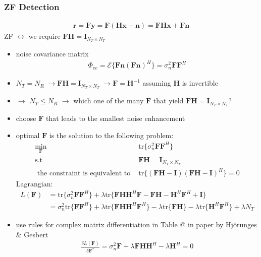 \documentclass[a4paper, 10pt]{article}
\makeatletter
\newcommand{\Rmnum}[1]{\expandafter\@slowromancap\romannumeral #1@}
\makeatother
\begin{document}
\subsubsection{ZF Detection}
\begin{align*}
	\mathbf{r}=\mathbf{Fy}=\mathbf{F}(\mathbf{Hx}+\mathbf{n})=\mathbf{FHx}+\mathbf{Fn}
\end{align*}
ZF $\leftrightarrow$ we require $\mathbf{FH}=\mathbf{I}_{N_T \times N_T}$
\begin{itemize}
	\item noise covariance matrix
	\begin{align*}
		\Phi_{ee}=\mathcal{E}\{\mathbf{Fn}(\mathbf{Fn})^H\}=\sigma_n^2\mathbf{FF}^H
	\end{align*}
	\item $N_T=N_R \; \rightarrow \mathbf{FH}=\mathbf{I}_{N_T \times N_T} \; \rightarrow \mathbf{F}=\mathbf{H}^{-1}$ assuming $\mathbf{H}$ is invertible
	\item $\rightarrow$ $N_T \leq N_R$ $\rightarrow$ which one of the many $\mathbf{F}$ that yield $\mathbf{FH}=\mathbf{I}_{N_T \times N_T}$?
	\item choose $\mathbf{F}$ that leads to the smallest noise enhancement
	\item optimal $\mathbf{F}$ is the solution to the following problem:
	\begin{align*}
		\underset{\mathbf{F}}{\mathrm{min}} \;& \mathrm{tr}\{\sigma_n^2\mathbf{FF}^H\}\\
		\text{s.t } &\mathbf{FH}=\mathbf{I}_{N_T \times N_T}\\
		\text{ the constraint} \text{ is equivalent to }
		&\mathrm{tr}\{(\mathbf{FH}-\mathbf{I})(\mathbf{FH}-\mathbf{I})^H\}=0
	\end{align*}
Lagrangian:
	\begin{align*}
		L(\mathbf{F})&=\mathrm{tr}\{\sigma_n^2\mathbf{FF}^H\}+\lambda \mathrm{tr}\{\mathbf{FHH}^H\mathbf{F}-\mathbf{FH}-\mathbf{H}^H\mathbf{F}^H+\mathbf{I}\}\\
			&=\sigma_n^2\mathrm{tr}\{\mathbf{FF}^H\}+\lambda \mathrm{tr}\{\mathbf{FHH}^H\mathbf{F}^H\}-\lambda\mathrm{tr}\{\mathbf{FH}\}
			-\lambda\mathrm{tr}\{\mathbf{H}^H\mathbf{F}^H\}+\lambda N_T
	\end{align*}
	\item use rules for complex matrix differentiation in Table \Rmnum{4} in paper by Hj\"orunges \& Gesbert
	\begin{align*}
		\frac{\delta L(\mathbf{F})}{\delta \mathbf{F}^*}=\sigma_n^2\mathbf{F}+\lambda\mathbf{FHH}^H-\lambda\mathbf{H}^H=0\\

\end{align*}
\end{itemize}
\end{document}
